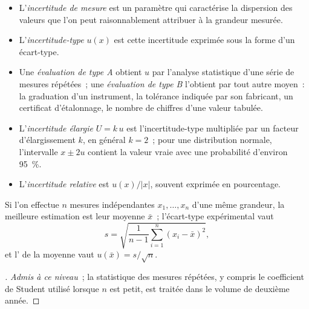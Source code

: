 \begin{definition}\label{def:b1:lab-techniques-1:uncertainty}
\begin{itemize}
  \item L'\emph{incertitude de mesure} est
        un paramètre qui caractérise la dispersion des valeurs que l'on
        peut raisonnablement attribuer à la grandeur mesurée.
  \item L'\emph{incertitude-type} $u(x)$ est
        cette incertitude exprimée sous la forme d'un écart-type.
  \item Une \emph{évaluation de type A}
        obtient $u$ par
        l'analyse statistique d'une série de mesures répétées~; une
        \emph{évaluation de type B}
        l'obtient par tout autre moyen~: la graduation d'un instrument, la
        tolérance indiquée par son fabricant, un certificat d'étalonnage,
        le nombre de chiffres d'une valeur tabulée.
  \item L'\emph{incertitude élargie}
        $U = k\,u$ est l'incertitude-type multipliée par un facteur
        d'élargissement $k$, en général $k = 2$~; pour une distribution
        normale, l'intervalle $x \pm 2u$ contient la valeur vraie avec une
        probabilité d'environ \qty{95}{\percent}.
  \item L'\emph{incertitude relative} est
        $u(x)/|x|$, souvent exprimée en pourcentage.
\end{itemize}
\end{definition}

\begin{proposition}\label{prop:b1:lab-techniques-1:type-a}
Si l'on effectue $n$ mesures indépendantes $x_1, \dots, x_n$ d'une même
grandeur, la meilleure estimation est leur moyenne $\bar x$~;
l'écart-type expérimental vaut
\[
  s = \sqrt{\frac{1}{n-1} \sum_{i=1}^{n} (x_i - \bar x)^2},
\]
et l' de la moyenne vaut $u(\bar x) = s/\sqrt{n}$.
\end{proposition}
\begin{proof}[\omnameProof]
\emph{Admis à ce niveau}~; la statistique des mesures répétées, y
compris le coefficient de Student utilisé lorsque $n$ est petit, est
traitée dans le volume de deuxième année.
\end{proof}

